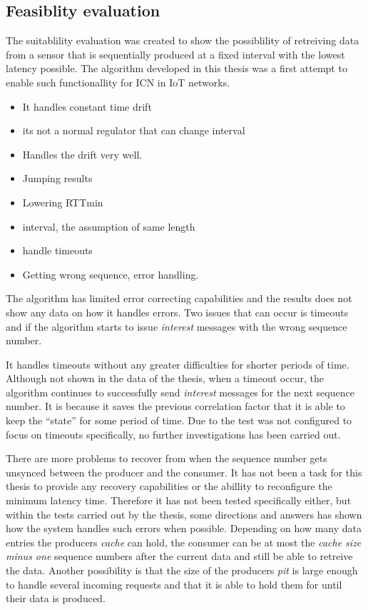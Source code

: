 \subsection{Feasiblity evaluation}
The suitablility evaluation was created to show the possiblility of retreiving data from a sensor that is sequentially produced at a fixed interval with the lowest latency possible. The algorithm developed in this thesis was a first attempt to enable such functionallity for ICN in IoT networks.

\begin{itemize}
\item It handles constant time drift
\item its not a normal regulator that can change interval
\item Handles the drift very well.
\end{itemize}

\begin{itemize}
\item Jumping results
\item Lowering RTTmin
\item interval, the assumption of same length
\end{itemize}

\begin{itemize}
\item handle timeouts
\item Getting wrong sequence, error handling.
\end{itemize}

The algorithm has limited error correcting capabilities and the results does not show any data on how it handles errors. Two issues that can occur is timeouts and if the algorithm starts to issue \textit{interest} messages with the wrong sequence number. 

It handles timeouts without any greater difficulties for shorter periods of time. Although not shown in the data of the thesis, when a timeout occur, the algorithm continues to successfully send \textit{interest} messages for the next sequence number. It is because it saves the previous correlation factor that it is able to keep the ``state'' for some period of time. Due to the test was not configured to focus on timeouts specifically, no further investigations has been carried out.

There are more problems to recover from when the sequence number gets unsynced between the producer and the consumer. 
It has not been a task for this thesis to provide any recovery capabilities or the abillity to reconfigure the minimum latency time. Therefore it has not been tested specifically either, but within the tests carried out by the thesis, some directions and answers has shown how the system handles such errors when possible.
Depending on how many data entries the producers \textit{cache} can hold, the consumer can be at most the \textit{cache size minus one} sequence numbers after the current data and still be able to retreive the data. 
Another possibility is that the size of the producers \textit{pit} is large enough to handle several incoming requests and that it is able to hold them for until their data is produced. 




